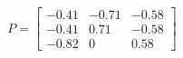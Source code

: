 \documentclass[preview]{standalone}
\begin{document}
\begin{align*}
P=\left[\begin{matrix}-0.41&-0.71&-0.58\\-0.41&0.71&-0.58\\-0.82&0&0.58\end{matrix}\right]
\end{align*}
\end{document}
